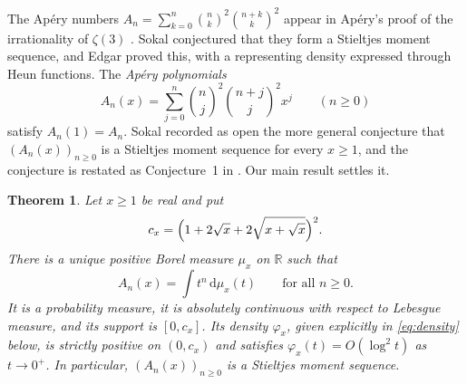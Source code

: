 \documentclass[11pt]{amsart}
\numberwithin{equation}{section}
\newtheorem{theorem}{Theorem}[section]
\theoremstyle{definition}
\theoremstyle{remark}
\newcommand{\R}{\mathbb{R}}
\newcommand{\dd}{\,\mathrm{d}}
\begin{document}
The Ap\'ery numbers $A_n=\sum_{k=0}^{n}\binom{n}{k}^2\binom{n+k}{k}^2$ appear in
Ap\'ery's proof of the irrationality of $\zeta(3)$ \cite{Ap}. Sokal conjectured
that they form a Stieltjes moment sequence, and Edgar \cite{Ed} proved this,
with a representing density expressed through Heun functions. The
\emph{Ap\'ery polynomials}
\begin{equation}\label{eq:apery}
A_n(x)=\sum_{j=0}^{n}\binom{n}{j}^2\binom{n+j}{j}^2x^j\qquad(n\ge0)
\end{equation}
satisfy $A_n(1)=A_n$. Sokal \cite[Introduction, (1.2)]{So20} recorded as open
the more general conjecture that $(A_n(x))_{n\ge0}$ is a Stieltjes moment
sequence for every $x\ge1$, and the conjecture is restated as Conjecture~1 in
\cite[slide~29]{So25}. Our main result settles it.

\begin{theorem}\label{thm:main}
Let $x\ge1$ be real and put
\begin{equation}\label{eq:cx}
c_x=\Bigl(1+2\sqrt{x}+2\sqrt{x+\sqrt{x}}\Bigr)^2 .
\end{equation}
There is a unique positive Borel measure $\mu_x$ on $\R$ such that
\[
A_n(x)=\int t^n\dd\mu_x(t)\qquad\text{for all } n\ge0 .
\]
It is a probability measure, it is absolutely continuous with respect to
Lebesgue measure, and its support is $[0,c_x]$. Its density $\varphi_x$,
given explicitly in \eqref{eq:density} below, is strictly positive on
$(0,c_x)$ and satisfies $\varphi_x(t)=O(\log^2t)$ as $t\to0^+$. In particular,
$(A_n(x))_{n\ge0}$ is a Stieltjes moment sequence.
\end{theorem}
\end{document}
